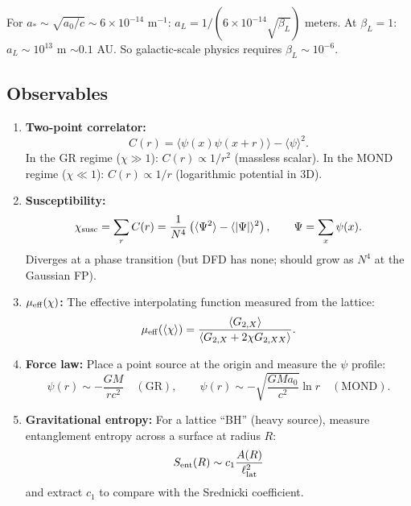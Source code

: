 \documentclass[11pt,a4paper]{article}
\begin{document}
For $a_* \sim \sqrt{a_0/c} \sim 6 \times 10^{-14}$ m$^{-1}$: $a_L = 1/(6\times10^{-14}\sqrt{\beta_L})$ meters. At $\beta_L = 1$: $a_L \sim 10^{13}$ m $\sim 0.1$ AU. So galactic-scale physics requires $\beta_L \sim 10^{-6}$.

\subsection{Observables}

\begin{enumerate}
\item \textbf{Two-point correlator:}
\begin{equation}
C(r) = \langle\psi(x)\psi(x+r)\rangle - \langle\psi\rangle^2.
\end{equation}
In the GR regime ($\chi \gg 1$): $C(r) \propto 1/r^2$ (massless scalar). In the MOND regime ($\chi \ll 1$): $C(r) \propto 1/r$ (logarithmic potential in 3D).

\item \textbf{Susceptibility:}
\begin{equation}
\chi_{\rm susc} = \sum_r C(r) = \frac{1}{N^4}\left(\langle\Psi^2\rangle - \langle|\Psi|\rangle^2\right), \qquad \Psi = \sum_x \psi(x).
\end{equation}
Diverges at a phase transition (but DFD has none; should grow as $N^4$ at the Gaussian FP).

\item \textbf{$\mu_{\rm eff}(\chi)$:} The effective interpolating function measured from the lattice:
\begin{equation}
\mu_{\rm eff}(\langle\chi\rangle) = \frac{\langle G_{2,X}\rangle}{\langle G_{2,X} + 2\chi G_{2,XX}\rangle}.
\end{equation}

\item \textbf{Force law:} Place a point source at the origin and measure the $\psi$ profile:
\begin{equation}
\psi(r) \sim -\frac{GM}{r c^2} \quad (\text{GR}), \qquad \psi(r) \sim -\sqrt{\frac{GMa_0}{c^2}}\ln r \quad (\text{MOND}).
\end{equation}

\item \textbf{Gravitational entropy:} For a lattice ``BH'' (heavy source), measure entanglement entropy across a surface at radius $R$:
\begin{equation}
S_{\rm ent}(R) \sim c_1 \frac{A(R)}{\ell_{\rm lat}^2}
\end{equation}
and extract $c_1$ to compare with the Srednicki coefficient.
\end{enumerate}
\end{document}
